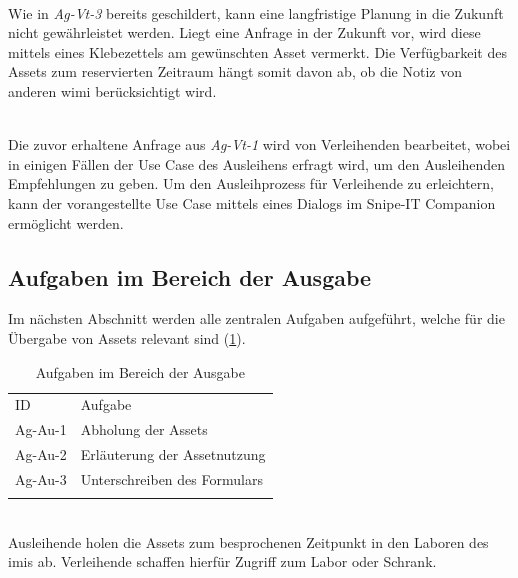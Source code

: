         {\sffamily\color{maincolor}{Ag-Vt-3 | Reservierung der Assets}}\\
Wie in \textit{Ag-Vt-3} bereits geschildert, kann eine langfristige Planung in die Zukunft nicht
gewährleistet werden. Liegt eine Anfrage in der Zukunft vor, wird diese mittels eines Klebezettels
am gewünschten Asset vermerkt. Die Verfügbarkeit des Assets zum reservierten Zeitraum hängt somit
davon ab, ob die Notiz von anderen \ac{wimi} berücksichtigt wird.

        {\sffamily\color{maincolor}{Ag-Vt-4 | Beratung der Ausleihenden}}\\
Die zuvor erhaltene Anfrage aus \textit{Ag-Vt-1} wird von Verleihenden bearbeitet, wobei in einigen
Fällen der Use Case des Ausleihens erfragt wird, um den Ausleihenden Empfehlungen zu geben. Um den
Ausleihprozess für Verleihende zu erleichtern, kann der vorangestellte Use Case mittels eines
Dialogs im Snipe-IT Companion ermöglicht werden. 


\subsection{Aufgaben im Bereich der Ausgabe}
Im nächsten Abschnitt werden alle zentralen Aufgaben aufgeführt, welche für die Übergabe von Assets
relevant sind (\ref{table:Ag-Au}).

\begin{table}[h]
        \centering
        \caption{Aufgaben im Bereich der Ausgabe}
        \begin{tabular}{ll}
                \arrayrulecolor{maincolor}\hline
                \sffamily\color{maincolor}ID & \sffamily\color{maincolor}Aufgabe \\
                \arrayrulecolor{maincolor}\hline
                Ag-Au-1                      & Abholung der Assets               \\
                Ag-Au-2                      & Erläuterung der Assetnutzung      \\
                Ag-Au-3                      & Unterschreiben des Formulars      \\
                \arrayrulecolor{maincolor}\hline
        \end{tabular}
        \label{table:Ag-Au}
\end{table}

{\sffamily\color{maincolor}{Ag-Au-1 | Abholung der Assets}}\\
Ausleihende holen die Assets zum besprochenen Zeitpunkt in den Laboren des \ac{imis} ab. Verleihende
schaffen hierfür Zugriff zum Labor oder Schrank.

